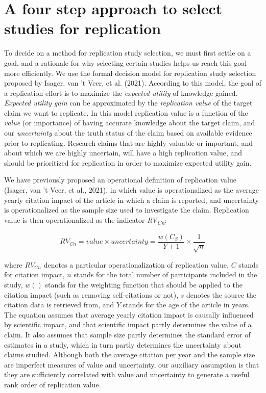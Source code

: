 \documentclass[
  man,floatsintext]{apa6}
\begin{document}
\hypertarget{a-four-step-approach-to-select-studies-for-replication}{%
\section{A four step approach to select studies for replication}\label{a-four-step-approach-to-select-studies-for-replication}}

To decide on a method for replication study selection, we must first settle on a goal, and a rationale for why selecting certain studies helps us reach this goal more efficiently. We use the formal decision model for replication study selection proposed by Isager, van 't Veer, et al. (2021). According to this model, the goal of a replication effort is to maximize the \emph{expected utility} of knowledge gained. \emph{Expected utility gain} can be approximated by the \emph{replication value} of the target claim we want to replicate. In this model replication value is a function of the \emph{value} (or importance) of having accurate knowledge about the target claim, and our \emph{uncertainty} about the truth status of the claim based on available evidence prior to replicating. Research claims that are highly valuable or important, and about which we are highly uncertain, will have a high replication value, and should be prioritized for replication in order to maximize expected utility gain.

We have previously proposed an operational definition of replication value (Isager, van 't Veer, et al., 2021), in which value is operationalized as the average yearly citation impact of the article in which a claim is reported, and uncertainty is operationalized as the sample size used to investigate the claim. Replication value is then operationalized as the indicator \emph{RV\textsubscript{Cn}}:

\begin{equation} 
  \tag{1}
  RV_{Cn} = value\times uncertainty = \frac{w(C_{S})}{Y+1}\times\frac{1}{\sqrt{n}}
  \label{eq:1}
\end{equation}

where \(RV_{Cn}\) denotes a particular operationalization of replication value, \(C\) stands for citation impact, \(n\) stands for the total number of participants included in the study, \(w()\) stands for the weighting function that should be applied to the citation impact (such as removing self-citations or not), \(s\) denotes the source the citation data is retrieved from, and \(Y\) stands for the age of the article in years. The equation assumes that average yearly citation impact is causally influenced by scientific impact, and that scientific impact partly determines the value of a claim. It also assumes that sample size partly determines the standard error of estimates in a study, which in turn partly determines the uncertainty about claims studied. Although both the average citation per year and the sample size are imperfect measures of value and uncertainty, our auxiliary assumption is that they are sufficiently correlated with value and uncertainty to generate a useful rank order of replication value.
\end{document}
